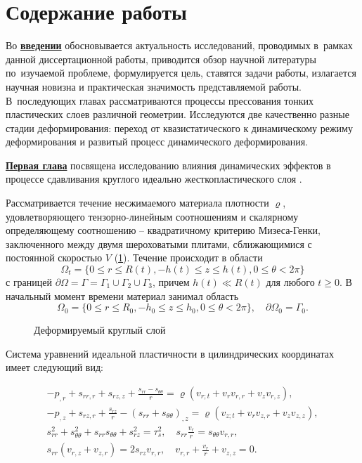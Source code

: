\section*{Содержание работы}
Во \underline{\textbf{введении}} обосновывается актуальность
исследований, проводимых в~рамках данной диссертационной работы,
приводится обзор научной литературы по~изучаемой проблеме,
формулируется цель, ставятся задачи работы, излагается научная новизна
и практическая значимость представляемой работы. В~последующих главах
рассматриваются процессы прессования тонких пластических слоев различной геометрии.
Исследуются две качественно разные стадии деформирования: переход от квазистатического к динамическому режиму деформирования и развитый процесс динамического деформирования.

\underline{\textbf{Первая глава}} посвящена исследованию влияния динамических эффектов в процессе сдавливания круглого идеально жесткопластического слоя \autocite{Shabaykin:2017}.

Рассматривается течение несжимаемого материала плотности $\varrho$, удовлетворяющего тензорно-линейным соотношениям и скалярному определяющему соотношению -- квадратичному критерию Мизеса-Генки, заключенного между двумя шероховатыми плитами, сближающимися с постоянной скоростью $V$ (\cref{fig:ch1/layer}). Течение происходит в области
\begin{equation}
  \Omega_{t} = \{0 \le r \le R(t), -h(t) \le z \le h(t), 0 \le \theta < 2\pi\}
\end{equation}
с границей $\partial\Omega = \Gamma = \Gamma_{1} \cup \Gamma_{2} \cup \Gamma_{3}$, причем $h(t) \ll R(t)$ для любого $t \ge 0$. В начальный момент времени материал занимал область
\begin{equation}
  \Omega_{0} = \{0 \le r \le R_{0}, -h_{0} \le z \le h_{0}, 0 \le \theta < 2\pi\}, \quad \partial\Omega_{0} = \Gamma_{0}.
\end{equation}

\begin{figure}[ht]
  \caption{Деформируемый круглый слой}
  \label{fig:ch1/layer}
\end{figure}

Система уравнений идеальной пластичности в цилиндрических координатах имеет следующий вид:

\begin{gather}
  \label{eqs:ch1/general/begin}
  -p_{,r}+s_{rr,r}+s_{rz,z}+\frac{s_{rr}-s_{\theta\theta}}{r} = \varrho \left(v_{r;t}+v_{r} v_{r,r} + v_{z} v_{r,z} \right),
  \\
  -p_{,z}+s_{rz,r}+\frac{s_{rz}}{r}-(s_{rr}+s_{\theta\theta})_{,z} = \varrho \left(v_{z;t}+v_{r} v_{z,r} + v_{z} v_{z,z} \right),
  \\
  s^2_{rr}+s^2_{\theta\theta}+s_{rr} s_{\theta\theta} + s^2_{rz}=\tau^2_{s}, \quad s_{rr} \frac{v_{r}}{r} = s_{\theta\theta} v_{r,r},
  \\
  \label{eqs:ch1/general/end}
  s_{rr} (v_{r,z}+v_{z,r}) = 2 s_{rz} v_{r,r}, \quad v_{r,r}+\frac{v_{r}}{r}+v_{z,z} = 0.
\end{gather}

